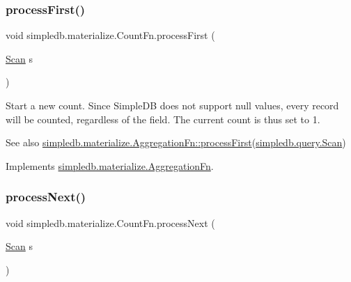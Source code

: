 \mbox{\label{classsimpledb_1_1materialize_1_1CountFn_ad2de83ee6906e5407cad7e8f2b2c9e42}} 
\subsubsection{\texorpdfstring{process\+First()}{processFirst()}}
{\footnotesize\ttfamily void simpledb.\+materialize.\+Count\+Fn.\+process\+First (\begin{DoxyParamCaption}\item[{\hyperlink{interfacesimpledb_1_1query_1_1Scan}{Scan}}]{s }\end{DoxyParamCaption})\hspace{0.3cm}{\ttfamily [inline]}}

Start a new count. Since Simple\+DB does not support null values, every record will be counted, regardless of the field. The current count is thus set to 1. \begin{DoxySeeAlso}{See also}
\hyperlink{interfacesimpledb_1_1materialize_1_1AggregationFn_abc424e0873445d14786ae0f3c539c80f}{simpledb.\+materialize.\+Aggregation\+Fn\+::process\+First}(\hyperlink{interfacesimpledb_1_1query_1_1Scan}{simpledb.\+query.\+Scan}) 
\end{DoxySeeAlso}


Implements \hyperlink{interfacesimpledb_1_1materialize_1_1AggregationFn_abc424e0873445d14786ae0f3c539c80f}{simpledb.\+materialize.\+Aggregation\+Fn}.

\mbox{\label{classsimpledb_1_1materialize_1_1CountFn_ac50cdba40eda7611ff8e015d8c305197}} 
\subsubsection{\texorpdfstring{process\+Next()}{processNext()}}
{\footnotesize\ttfamily void simpledb.\+materialize.\+Count\+Fn.\+process\+Next (\begin{DoxyParamCaption}\item[{\hyperlink{interfacesimpledb_1_1query_1_1Scan}{Scan}}]{s }\end{DoxyParamCaption})\hspace{0.3cm}{\ttfamily [inline]}}

